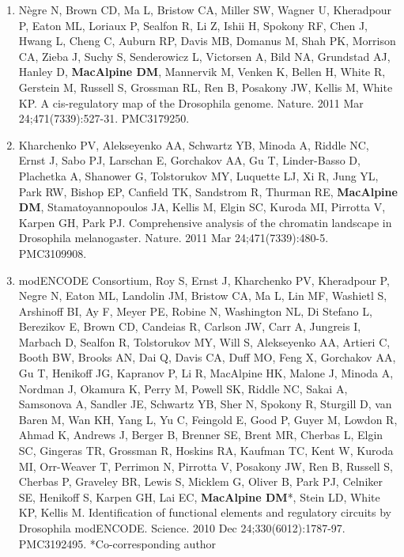 \documentclass{nihbiosketch}
\begin{document}
\begin{enumerate}
\begin{enumerate}
\item Nègre N, Brown CD, Ma L, Bristow CA, Miller SW, Wagner U, Kheradpour P, Eaton ML, Loriaux P, Sealfon R, Li Z, Ishii H, Spokony RF, Chen J, Hwang L, Cheng C, Auburn RP, Davis MB, Domanus M, Shah PK, Morrison CA, Zieba J, Suchy S, Senderowicz L, Victorsen A, Bild NA, Grundstad AJ, Hanley D, \textbf{MacAlpine DM}, Mannervik M, Venken K, Bellen H, White R, Gerstein M, Russell S, Grossman RL, Ren B, Posakony JW, Kellis M, White KP. A cis-regulatory map of the Drosophila genome. Nature. 2011 Mar 24;471(7339):527-31. PMC3179250.

\item Kharchenko PV, Alekseyenko AA, Schwartz YB, Minoda A, Riddle NC, Ernst J, Sabo PJ, Larschan E, Gorchakov AA, Gu T, Linder-Basso D, Plachetka A, Shanower G, Tolstorukov MY, Luquette LJ, Xi R, Jung YL, Park RW, Bishop EP, Canfield TK, Sandstrom R, Thurman RE, \textbf{MacAlpine DM}, Stamatoyannopoulos JA, Kellis M, Elgin SC, Kuroda MI, Pirrotta V, Karpen GH, Park PJ. Comprehensive analysis of the chromatin landscape in Drosophila melanogaster. Nature. 2011 Mar 24;471(7339):480-5. PMC3109908.

\item modENCODE Consortium, Roy S, Ernst J, Kharchenko PV, Kheradpour P, Negre N, Eaton ML, Landolin JM, Bristow CA, Ma L, Lin MF, Washietl S, Arshinoff BI, Ay F, Meyer PE, Robine N, Washington NL, Di Stefano L, Berezikov E, Brown CD, Candeias R, Carlson JW, Carr A, Jungreis I, Marbach D, Sealfon R, Tolstorukov MY, Will S, Alekseyenko AA, Artieri C, Booth BW, Brooks AN, Dai Q, Davis CA, Duff MO, Feng X, Gorchakov AA, Gu T, Henikoff JG, Kapranov P, Li R, MacAlpine HK, Malone J, Minoda A, Nordman J, Okamura K, Perry M, Powell SK, Riddle NC, Sakai A, Samsonova A, Sandler JE, Schwartz YB, Sher N, Spokony R, Sturgill D, van Baren M, Wan KH, Yang L, Yu C, Feingold E, Good P, Guyer M, Lowdon R, Ahmad K, Andrews J, Berger B, Brenner SE, Brent MR, Cherbas L, Elgin SC, Gingeras TR, Grossman R, Hoskins RA, Kaufman TC, Kent W, Kuroda MI, Orr-Weaver T, Perrimon N, Pirrotta V, Posakony JW, Ren B, Russell S, Cherbas P, Graveley BR, Lewis S, Micklem G, Oliver B, Park PJ, Celniker SE, Henikoff S, Karpen GH, Lai EC, \textbf{MacAlpine DM}*, Stein LD, White KP, Kellis M. Identification of functional elements and regulatory circuits by Drosophila modENCODE. Science. 2010 Dec 24;330(6012):1787-97. PMC3192495. *Co-corresponding author

\end{enumerate}


\end{enumerate}
\end{document}
